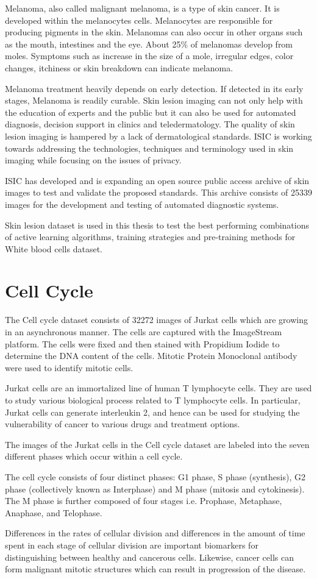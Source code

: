Melanoma, also called malignant melanoma, is a type of skin cancer. It is developed within the melanocytes cells. Melanocytes are responsible for producing pigments in the skin. Melanomas can also occur in other organs such as the mouth, intestines and the eye. About 25\% of melanomas develop from moles. Symptoms such as increase in the size of a mole, irregular edges, color changes, itchiness or skin breakdown can indicate melanoma.

Melanoma treatment heavily depends on early detection. If detected in its early stages, Melanoma is readily curable. Skin lesion imaging can not only help with the education of experts and the public but it can also be used for automated diagnosis, decision support in clinics and teledermatology. The quality of skin lesion imaging is hampered by a lack of dermatological standards. ISIC is working towards addressing the technologies, techniques and terminology used in skin imaging while focusing on the issues of privacy.

ISIC has developed and is expanding an open source public access archive of skin images to test and validate the proposed standards. This archive consists of 25339 images for the development and testing of automated diagnostic systems.

Skin lesion dataset is used in this thesis to test the best performing combinations of active learning algorithms, training strategies and pre-training methods for White blood cells dataset.

\section{Cell Cycle}

The Cell cycle dataset consists of 32272 images of Jurkat cells which are growing in an asynchronous manner. The cells are captured with the ImageStream platform. The cells were fixed and then stained with Propidium Iodide to determine the DNA content of the cells. Mitotic Protein Monoclonal antibody were used to identify mitotic cells.

Jurkat cells are an immortalized line of human T lymphocyte cells. They are used to study various biological process related to T lymphocyte cells. In particular, Jurkat cells can generate interleukin 2, and hence can be used for studying the vulnerability of cancer to various drugs and treatment options.

The images of the Jurkat cells in the Cell cycle dataset are labeled into the seven different phases which occur within a cell cycle.

The cell cycle consists of four distinct phases: G1 phase, S phase (synthesis), G2 phase (collectively known as Interphase) and M phase (mitosis and cytokinesis). The M phase is further composed of four stages i.e. Prophase, Metaphase, Anaphase, and Telophase.

Differences in the rates of cellular division and differences in the amount of time spent in each stage of cellular division are important biomarkers for distinguishing between healthy and cancerous cells. Likewise, cancer cells can form malignant mitotic structures which can result in progression of the disease. 